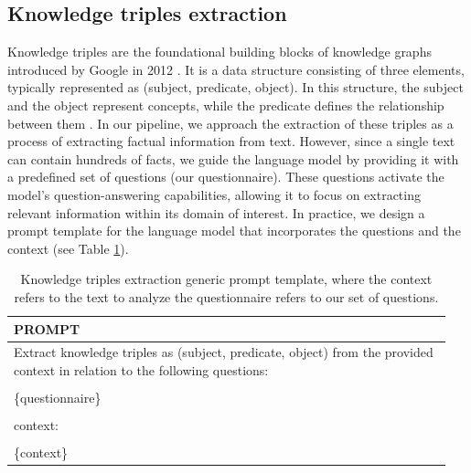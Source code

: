 \documentclass{article}
\begin{document}

\subsection{Knowledge triples extraction}
\par 
Knowledge triples are the foundational building blocks of knowledge graphs introduced by Google in 2012 \citep{2017.SH.MAO}. 
It is a data structure consisting of three elements, typically represented as (subject, predicate, object). 
In this structure, the subject and the object represent concepts, while the predicate defines the relationship between them \citep{2017.SH.MAO}. 
In our pipeline, we approach the extraction of these triples as a process of extracting factual information from text. However, since a single text can contain hundreds of facts, we guide the language model by providing it with a predefined set of questions (our questionnaire). 
These questions activate the model's question-answering capabilities, allowing it to focus on extracting relevant information within its domain of interest. 
In practice, we design a prompt template for the language model that incorporates the questions and the context (see Table \ref{tab:kt_extraction_tab}).

\begin{table}[ht]
\centering
\caption{Knowledge triples extraction generic prompt template, where the context refers to the text to analyze the questionnaire refers to our set of questions.}
\label{tab:kt_extraction_tab}
\begin{tabular}{p{0.95\linewidth}}
\toprule
\textbf{PROMPT} \\ 
\midrule
Extract knowledge triples as (subject, predicate, object) from the provided context 
in relation to the following questions: \\ \\
\{questionnaire\}  \\ \\
context: \\ \\
\{context\} \\ 
\bottomrule
\end{tabular}
\end{table}
\end{document}
